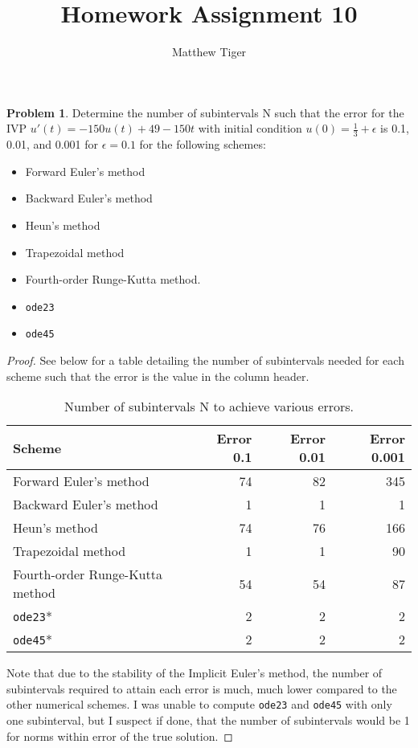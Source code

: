 \documentclass[12pt]{article}
\title{Homework Assignment 10}
\author{Matthew Tiger}
\theoremstyle{definition}
\newtheorem{problem}{Problem}
\begin{document}
\maketitle


\begin{problem} Determine the number of subintervals N such that the error for
  the IVP $u'(t) = -150 u(t) +49 - 150t$ with initial condition $u(0) = \frac{1}{3} + \epsilon$
  is 0.1, 0.01, and 0.001 for $\epsilon = 0.1$ for the following schemes:
  \begin{itemize}
    \item Forward Euler's method
    \item Backward Euler's method
    \item Heun's method
    \item Trapezoidal method
    \item Fourth-order Runge-Kutta method.
    \item \texttt{ode23}
    \item \texttt{ode45}
  \end{itemize}
\end{problem}

\begin{proof}
See below for a table detailing the number of subintervals needed for each
scheme such that the error is the value in the column header.

\begin{table}[h!]
  \begin{center}
    \label{tab:table1}
    \begin{tabular}{|l|r|r|r|}
      \hline
      \textbf{Scheme} & \textbf{Error 0.1} & \textbf{Error 0.01} & \textbf{Error 0.001}\\
      \hline
      Forward Euler's method & 74 & 82 & 345 \\
      Backward Euler's method & 1 & 1 & 1 \\
      Heun's method & 74 & 76 & 166 \\
      Trapezoidal method & 1 & 1 & 90 \\
      Fourth-order Runge-Kutta method & 54 & 54 & 87\\
      \texttt{ode23}* & 2 & 2 & 2 \\
      \texttt{ode45}* & 2 & 2 & 2 \\
      \hline
    \end{tabular}
    \caption{Number of subintervals N to achieve various errors.}
  \end{center}
\end{table}

Note that due to the stability of the Implicit Euler's method, the number of
subintervals required to attain each error is much, much lower compared to the
other numerical schemes. I was unable to compute \texttt{ode23} and \texttt{ode45} with only one subinterval, but
I suspect if done, that the number of subintervals would be 1 for norms within error of the true solution.
\end{proof}
\end{document}
